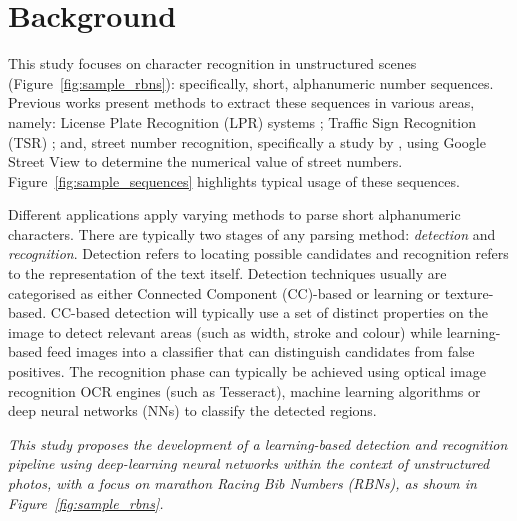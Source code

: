 \section{Background}
\label{sec:introduction:background}

This study focuses on character recognition in unstructured scenes (Figure~\ref{fig:sample_rbns}): specifically, short, alphanumeric number sequences. Previous works present methods to extract these sequences in various areas, namely: License Plate Recognition (LPR) systems \citep{CanoPerez:2003fq,Anagnostopoulos:2006wv}; Traffic Sign Recognition (TSR) \citep{Eichner:2008dw,Kundu:2015vq,Seo:2015ez,Lian:2016dc}; and, street number recognition, specifically a study by \citet{Netzer:2011to}, using Google Street View to determine the numerical value of street numbers. Figure~\ref{fig:sample_sequences} highlights typical usage of these sequences.

Different applications apply varying methods to parse short alphanumeric characters. There are typically two stages of any parsing method: \textit{detection} and \textit{recognition}. Detection refers to locating possible candidates and recognition refers to the representation of the text itself. Detection techniques usually are categorised as either Connected Component (CC)-based or learning or texture-based. CC-based detection will typically use a set of distinct properties on the image to detect relevant areas (such as width, stroke and colour) while learning-based feed images into a classifier that can distinguish candidates from false positives. The recognition phase can typically be achieved using optical image recognition OCR engines (such as Tesseract), machine learning algorithms or deep neural networks (NNs) to classify the detected regions. %

{
  \itshape
  This study proposes the development of a learning-based detection and recognition pipeline using deep-learning neural networks within the context of unstructured photos, with a focus on marathon Racing Bib Numbers (RBNs), as shown in Figure~\ref{fig:sample_rbns}.
}

